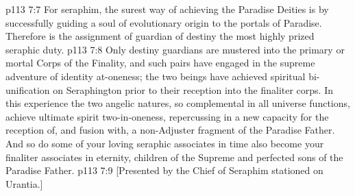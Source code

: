 \vs p113 7:7 \pc For seraphim, the surest way of achieving the Paradise Deities is by successfully guiding a soul of evolutionary origin to the portals of Paradise. Therefore is the assignment of guardian of destiny the most highly prized seraphic duty.
\vs p113 7:8 Only destiny guardians are mustered into the primary or mortal Corps of the Finality, and such pairs have engaged in the supreme adventure of identity at\hyp{}oneness; the two beings have achieved spiritual bi\hyp{}unification on Seraphington prior to their reception into the finaliter corps. In this experience the two angelic natures, so complemental in all universe functions, achieve ultimate spirit two\hyp{}in\hyp{}oneness, repercussing in a new capacity for the reception of, and fusion with, a non\hyp{}Adjuster fragment of the Paradise Father. And so do some of your loving seraphic associates in time also become your finaliter associates in eternity, children of the Supreme and perfected sons of the Paradise Father.
\vsetoff
\vs p113 7:9 [Presented by the Chief of Seraphim stationed on Urantia.]
